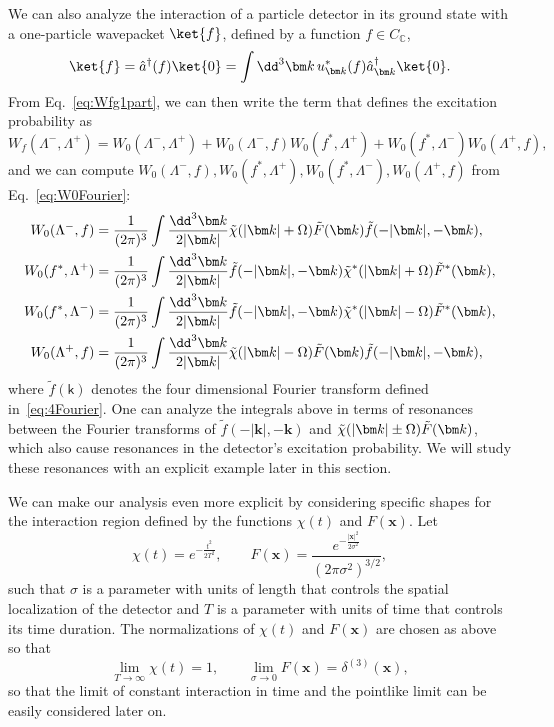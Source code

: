 \documentclass[letterpaper,12pt,titlepage,oneside,final]{book}
\newcommand{\mf}{\mathsf}%
\begin{document}
We can also analyze the interaction of a particle detector in its ground state with a one-particle wavepacket $\ket{f}$, defined by a function $f\in C_\mathbb{C}$,
\begin{equation}
    \ket{f} = \hat{a}^\dagger(f)\ket{0} = \int \dd^3\bm k \,u_{\bm k}^*(f) \hat{a}_{\bm k}^\dagger \ket{0}.
\end{equation}
From Eq.~\eqref{eq:Wfg1part}, we can then write the term that defines the excitation probability as  
\begin{equation}
    W_f(\Lambda^-,\Lambda^+) = W_0(\Lambda^-,\Lambda^+) + W_0(\Lambda^-,f)W_0(f^*,\Lambda^+) + W_0(f^*,\Lambda^-)W_0(\Lambda^+,f),
\end{equation}
and we can compute $W_0(\Lambda^-,f), W_0(f^*,\Lambda^+), W_0(f^*,\Lambda^-), W_0(\Lambda^+,f)$ from Eq.~\eqref{eq:W0Fourier}:
\begin{align}
    W_0(\Lambda^-,f) &= \frac{1}{(2\pi)^3}\int \frac{\dd^3\bm k}{2|\bm k|} \tilde{\chi}(|\bm k|+\Omega)\Tilde{F}(\bm k) \tilde{f}(-|\bm k|,-\bm k),\\
    W_0(f^*,\Lambda^+) &= \frac{1}{(2\pi)^3}\int \frac{\dd^3\bm k}{2|\bm k|} \tilde{f}(-|\bm k|,-\bm k) \tilde{\chi}^*(|\bm k|+\Omega)\Tilde{F}^*(\bm k),\\
    W_0(f^*,\Lambda^-) &= \frac{1}{(2\pi)^3}\int \frac{\dd^3\bm k}{2|\bm k|} \tilde{f}(-|\bm k|,-\bm k)\tilde{\chi}^*(|\bm k|-\Omega)\Tilde{F}^*(\bm k),\\
    W_0(\Lambda^+,f) &= \frac{1}{(2\pi)^3}\int \frac{\dd^3\bm k}{2|\bm k|} \tilde{\chi}(|\bm k|-\Omega)\Tilde{F}(\bm k) \tilde{f}(-|\bm k|,-\bm k),
\end{align}
where $\tilde{f}(\mf k)$ denotes the four dimensional Fourier transform defined in~\eqref{eq:4Fourier}. One can analyze the integrals above in terms of resonances between the Fourier transforms of $\tilde{f}(-|\bm k|,-\bm k)$ and $\tilde{\chi}(|\bm k|\pm\Omega)\Tilde{F}(\bm k)$, which also cause resonances in the detector's excitation probability. We will study these resonances with an explicit example later in this section.


We can make our analysis even more explicit by considering specific shapes for the interaction region defined by the functions $\chi(t)$ and $F(\bm x)$. Let
\begin{equation}\label{eq:prototype}
    \chi(t) = e^{- \frac{t^2}{2T^2}},\quad \quad
    F(\bm x) = \frac{e^{- \frac{|\bm x|^2}{2\sigma^2}}}{(2\pi\sigma^2)^{3/2}},
\end{equation}
such that $\sigma$ is a parameter with units of length that controls the spatial localization of the detector and $T$ is a parameter with units of time that controls its time duration. The normalizations of $\chi(t)$ and $F(\bm x)$ are chosen as above so that
\begin{equation}
    \lim_{T\to \infty} \chi(t) = 1, \quad \quad \lim_{\sigma \to 0} F(\bm x) = \delta^{(3)}(\bm x),
\end{equation}
so that the limit of constant interaction in time and the pointlike limit can be easily considered later on. 
\end{document}

